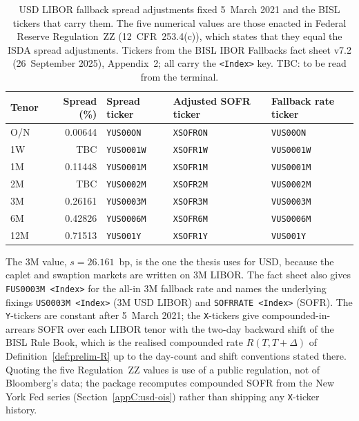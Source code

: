 \begin{table}[htbp]
\centering\small
\caption{USD LIBOR fallback spread adjustments fixed 5~March 2021 and the BISL tickers that carry them. The five numerical values are those enacted in Federal Reserve Regulation~ZZ (12~CFR~253.4(c)), which states that they equal the ISDA spread adjustments. Tickers from the BISL IBOR Fallbacks fact sheet v7.2 (26~September 2025), Appendix~2; all carry the \texttt{<Index>} key. TBC: to be read from the terminal.}
\label{tab:usd-spread}
\begin{tabular}{@{}lrlll@{}}
\toprule
Tenor & Spread (\%) & Spread ticker & Adjusted SOFR ticker & Fallback rate ticker \\
\midrule
O/N & 0.00644 & \texttt{YUS00ON} & \texttt{XSOFRON} & \texttt{VUS00ON} \\
1W & TBC & \texttt{YUS0001W} & \texttt{XSOFR1W} & \texttt{VUS0001W} \\
1M & 0.11448 & \texttt{YUS0001M} & \texttt{XSOFR1M} & \texttt{VUS0001M} \\
2M & TBC & \texttt{YUS0002M} & \texttt{XSOFR2M} & \texttt{VUS0002M} \\
3M & 0.26161 & \texttt{YUS0003M} & \texttt{XSOFR3M} & \texttt{VUS0003M} \\
6M & 0.42826 & \texttt{YUS0006M} & \texttt{XSOFR6M} & \texttt{VUS0006M} \\
12M & 0.71513 & \texttt{YUS001Y} & \texttt{XSOFR1Y} & \texttt{VUS001Y} \\
\bottomrule
\end{tabular}
\end{table}

The 3M value, $s=26.161$~bp, is the one the thesis uses for USD, because the caplet and swaption markets are written on 3M LIBOR. The fact sheet also gives \texttt{FUS0003M <Index>} for the all-in 3M fallback rate and names the underlying fixings \texttt{US0003M <Index>} (3M USD LIBOR) and \texttt{SOFRRATE <Index>} (SOFR). The \texttt{Y}-tickers are constant after 5~March 2021; the \texttt{X}-tickers give compounded-in-arrears SOFR over each LIBOR tenor with the two-day backward shift of the BISL Rule Book, which is the realised compounded rate $R(T,T+\Delta)$ of Definition~\ref{def:prelim-R} up to the day-count and shift conventions stated there. Quoting the five Regulation~ZZ values is use of a public regulation, not of Bloomberg's data; the package recomputes compounded SOFR from the New York Fed series (Section~\ref{appC:usd-ois}) rather than shipping any \texttt{X}-ticker history.

